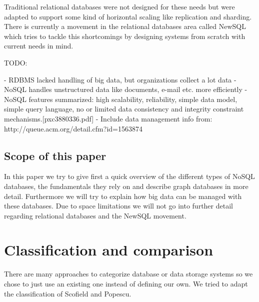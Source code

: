 \documentclass{sig-alternate}
\begin{document}
Traditional relational databases were not designed for these needs but were adapted to support some kind of horizontal scaling like replication and sharding. There is currently a movement in the relational databases area called NewSQL which tries to tackle this shortcomings by designing systems from scratch with current needs in mind.

TODO: 

- RDBMS lacked handling of big data, but organizations collect a lot data
- NoSQL handles unstructured data like documents, e-mail etc. more efficiently
- NoSQL features summarized: high scalability, reliability, simple data model, simple query language, no or limited data consistency and integrity constraint mechanisms.[pxc3880336.pdf]
- Include data management info from: http://queue.acm.org/detail.cfm?id=1563874


\subsection{Scope of this paper}

In this paper we try to give first a quick overview of the different types of NoSQL databases, the fundamentals they rely on and describe graph databases in more detail. Furthermore we will try to explain how big data can be managed with these databases.
Due to space limitations we will not go into further detail regarding relational databases and the NewSQL movement.

\section{Classification and comparison}

There are many approaches to categorize database or data storage systems so we chose to just use an existing one instead of defining our own. We tried to adapt the classification of Scofield and Popescu\cite{scofield:classification}.
\end{document}
